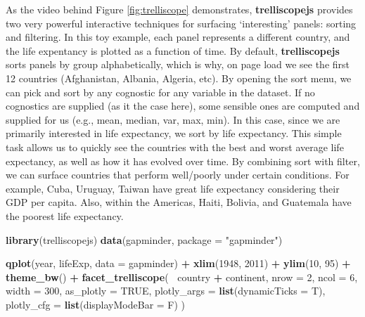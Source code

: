 \documentclass[
  12pt,
]{krantz}
\newenvironment{Shaded}{\begin{snugshade}}{\end{snugshade}}
\newcommand{\DataTypeTok}[1]{\textcolor[rgb]{0.13,0.29,0.53}{#1}}
\newcommand{\DecValTok}[1]{\textcolor[rgb]{0.00,0.00,0.81}{#1}}
\newcommand{\KeywordTok}[1]{\textcolor[rgb]{0.13,0.29,0.53}{\textbf{#1}}}
\newcommand{\NormalTok}[1]{#1}
\newcommand{\OperatorTok}[1]{\textcolor[rgb]{0.81,0.36,0.00}{\textbf{#1}}}
\newcommand{\OtherTok}[1]{\textcolor[rgb]{0.56,0.35,0.01}{#1}}
\newcommand{\StringTok}[1]{\textcolor[rgb]{0.31,0.60,0.02}{#1}}
\begin{document}
As the video behind Figure \ref{fig:trelliscope} demonstrates, \textbf{trelliscopejs} provides two very powerful interactive techniques for surfacing `interesting' panels: sorting and filtering. In this toy example, each panel represents a different country, and the life expentancy is plotted as a function of time. By default, \textbf{trelliscopejs} sorts panels by group alphabetically, which is why, on page load we see the first 12 countries (Afghanistan, Albania, Algeria, etc). By opening the sort menu, we can pick and sort by any cognostic for any variable in the dataset. If no cognostics are supplied (as it the case here), some sensible ones are computed and supplied for us (e.g., mean, median, var, max, min). In this case, since we are primarily interested in life expectancy, we sort by life expectancy. This simple task allows us to quickly see the countries with the best and worst average life expectancy, as well as how it has evolved over time. By combining sort with filter, we can surface countries that perform well/poorly under certain conditions. For example, Cuba, Uruguay, Taiwan have great life expectancy considering their GDP per capita. Also, within the Americas, Haiti, Bolivia, and Guatemala have the poorest life expectancy.

\begin{Shaded}
\begin{Highlighting}[]
\KeywordTok{library}\NormalTok{(trelliscopejs)}
\KeywordTok{data}\NormalTok{(gapminder, }\DataTypeTok{package =} \StringTok{"gapminder"}\NormalTok{)}

\KeywordTok{qplot}\NormalTok{(year, lifeExp, }\DataTypeTok{data =}\NormalTok{ gapminder) }\OperatorTok{+}
\StringTok{  }\KeywordTok{xlim}\NormalTok{(}\DecValTok{1948}\NormalTok{, }\DecValTok{2011}\NormalTok{) }\OperatorTok{+}\StringTok{ }\KeywordTok{ylim}\NormalTok{(}\DecValTok{10}\NormalTok{, }\DecValTok{95}\NormalTok{) }\OperatorTok{+}\StringTok{ }\KeywordTok{theme_bw}\NormalTok{() }\OperatorTok{+}
\StringTok{  }\KeywordTok{facet_trelliscope}\NormalTok{(}\OperatorTok{~}\StringTok{ }\NormalTok{country }\OperatorTok{+}\StringTok{ }\NormalTok{continent,}
    \DataTypeTok{nrow =} \DecValTok{2}\NormalTok{, }\DataTypeTok{ncol =} \DecValTok{6}\NormalTok{, }\DataTypeTok{width =} \DecValTok{300}\NormalTok{, }
    \DataTypeTok{as_plotly =} \OtherTok{TRUE}\NormalTok{, }
    \DataTypeTok{plotly_args =} \KeywordTok{list}\NormalTok{(}\DataTypeTok{dynamicTicks =}\NormalTok{ T),}
    \DataTypeTok{plotly_cfg =} \KeywordTok{list}\NormalTok{(}\DataTypeTok{displayModeBar =}\NormalTok{ F)}
\NormalTok{  )}
\end{Highlighting}
\end{Shaded}
\end{document}
